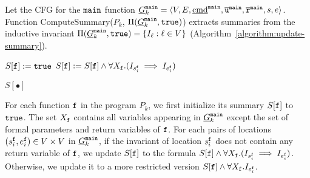 Let the CFG for the $\mathtt{{main}}$ function $\underline{G}^{\mathtt{{main}}}_k = \langle V, E, \underline{\textmd{cmd}}^{\mathtt{{main}}}, \overline{\mathtt{u}}^{\mathtt{{main}}}, \overline{\mathtt{r}}^{\mathtt{{main}}},s,e \rangle$.
Function 
ComputeSummary($P_k$, $\Pi (\underline{G}^{\mathtt{{main}}}_k, \mathtt{true})$)
extracts summaries from the inductive invariant $\Pi (\underline{G}^{\mathtt{{main}}}_k, \mathtt{true})= \{ I_\ell : \ell \in V
\}$ (Algorithm~\ref{algorithm:update-summary}). 

\begin{algorithm}

  {	
  	$S[\mathtt{{f}}]:=\mathtt{true}$\;
   	{
       	{
         		$S[\mathtt{{f}}]:=S[\mathtt{{f}}]\wedge \forall X_\mathtt{f}. (I_{s_i^{\mathtt{{f}}}} \implies I_{e_i^{\mathtt{{f}}}})$\;
       	}
   	}
    
  }
 
  \Return $S[\bullet]$\;
  \caption{
  $\textmd{ComputeSummary}(P_k, \Pi (\underline{G}^{\fun{main}}_k, \TT))$}
  \label{algorithm:update-summary}
\end{algorithm}

For each function $\mathtt{{f}}$ in the program $P_k$, we first initialize its summary $S[\mathtt{{f}}]$ to $\mathtt{true}$.
The set $X_{\mathtt{{f}}}$ contains all variables appearing in $\underline{G}^{\mathtt{{main}}}_k$ except the set of formal parameters and return variables of $\mathtt{{f}}$.
For each pairs of locations $(s_i^{\mathtt{{f}}},e_i^{\mathtt{{f}}})\in V\times V$ in $\underline{G}^{\mathtt{{main}}}_k$, if the invariant of location $s_i^{\mathtt{{f}}}$ does not contain any return variable of $\mathtt{{f}}$, we update $S[\mathtt{{f}}]$ to the formula $S[\mathtt{{f}}]\wedge \forall X_{\mathtt{{f}}}. (I_{s_i^{\mathtt{{f}}}} \implies I_{e_i^{\mathtt{{f}}}})$. Otherwise, we update it to a more restricted version $S[\mathtt{{f}}]\wedge \forall X_{\mathtt{{f}}}.I_{e_i^{\mathtt{{f}}}}$.

